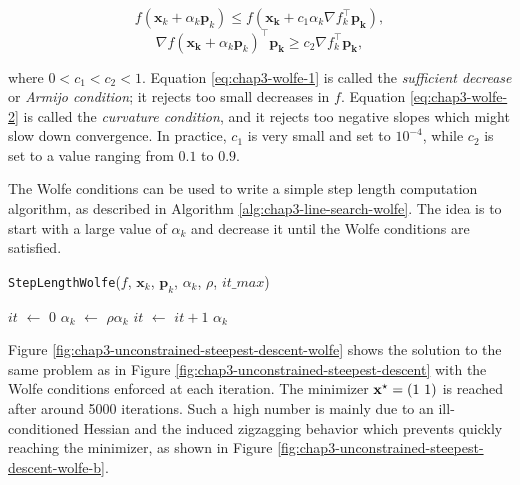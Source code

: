 \begin{equation}
\label{eq:chap3-wolfe-1}
f(\mathbf{x}_k + \alpha_k\mathbf{p}_k) \le
f(\mathbf{x_k}+c_1\alpha_k\nabla f_k^{\top}\mathbf{p_k}),
\end{equation}
\begin{equation}
\label{eq:chap3-wolfe-2}
\nabla f(\mathbf{x_k} + \alpha_k
\mathbf{p}_k)^{\top}\mathbf{p_k} \ge c_2 \nabla f_k^{\top}\mathbf{p_k},
\end{equation}

where $0 < c_1 < c_2 < 1$. Equation \ref{eq:chap3-wolfe-1} is called
the \emph{sufficient decrease} or \emph {Armijo condition}; it rejects
too small decreases in $f$. Equation \ref{eq:chap3-wolfe-2} is called
the \emph{curvature condition}, and it rejects too negative slopes
which might slow down convergence. In practice, $c_1$ is very small
and set to $10^{-4}$, while $c_2$ is set to a value ranging from $0.1$
to $0.9$.

The Wolfe conditions can be used to write a simple step length
computation algorithm, as described in Algorithm
\ref{alg:chap3-line-search-wolfe}. The idea is to start with a large
value of $\alpha_k$ and decrease it until the Wolfe conditions are
satisfied.

\begin{algorithm}
\caption{\texttt{StepLengthWolfe}($f$, $\mathbf{x}_k$, $\mathbf{p}_k$,
  $\alpha_k$, $\rho$, $it\_max$)}
\label{alg:chap3-line-search-wolfe}
\begin{algorithmic}
\STATE $it$ $\leftarrow$ $0$
\STATE $\alpha_k$ $\leftarrow$ $\rho \alpha_k$ 
\STATE $it$ $\leftarrow$ $it + 1$
\ENDWHILE
\RETURN $\alpha_k$
\end{algorithmic}
\end{algorithm}

Figure \ref{fig:chap3-unconstrained-steepest-descent-wolfe} shows the
solution to the same problem as in Figure
\ref{fig:chap3-unconstrained-steepest-descent} with the Wolfe
conditions enforced at each iteration. The minimizer
$\mathbf{x}^{\star}=(1~1)$ is reached after around 5000 iterations. Such a
high number is mainly due to an ill-conditioned Hessian and the
induced zigzagging behavior which prevents quickly reaching the
minimizer, as shown in Figure
\ref{fig:chap3-unconstrained-steepest-descent-wolfe-b}.

